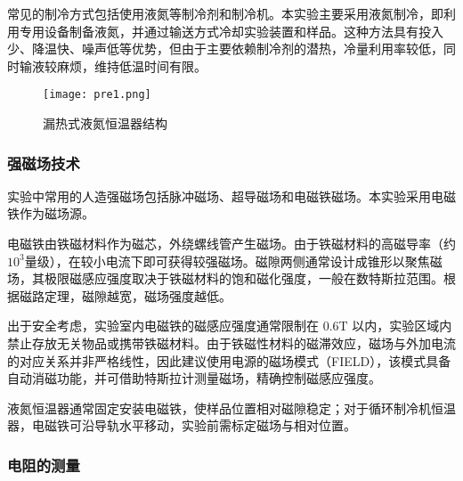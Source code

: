 常见的制冷方式包括使用液氮等制冷剂和制冷机。本实验主要采用液氮制冷，即利用专用设备制备液氮，并通过输送方式冷却实验装置和样品。这种方法具有投入少、降温快、噪声低等优势，但由于主要依赖制冷剂的潜热，冷量利用率较低，同时输液较麻烦，维持低温时间有限。

\begin{figure}[h!]
    \centering
    \texttt{[image: pre1.png]}
    \caption{漏热式液氮恒温器结构}
    \label{fig:cryostat}
\end{figure}

\subsubsection{强磁场技术}

实验中常用的人造强磁场包括脉冲磁场、超导磁场和电磁铁磁场。本实验采用电磁铁作为磁场源。

电磁铁由铁磁材料作为磁芯，外绕螺线管产生磁场。由于铁磁材料的高磁导率（约$10^3$量级），在较小电流下即可获得较强磁场。磁隙两侧通常设计成锥形以聚焦磁场，其极限磁感应强度取决于铁磁材料的饱和磁化强度，一般在数特斯拉范围。根据磁路定理，磁隙越宽，磁场强度越低。

出于安全考虑，实验室内电磁铁的磁感应强度通常限制在 0.6T 以内，实验区域内禁止存放无关物品或携带铁磁材料。由于铁磁性材料的磁滞效应，磁场与外加电流的对应关系并非严格线性，因此建议使用电源的磁场模式（FIELD），该模式具备自动消磁功能，并可借助特斯拉计测量磁场，精确控制磁感应强度。

液氮恒温器通常固定安装电磁铁，使样品位置相对磁隙稳定；对于循环制冷机恒温器，电磁铁可沿导轨水平移动，实验前需标定磁场与相对位置。

\subsubsection{电阻的测量}

